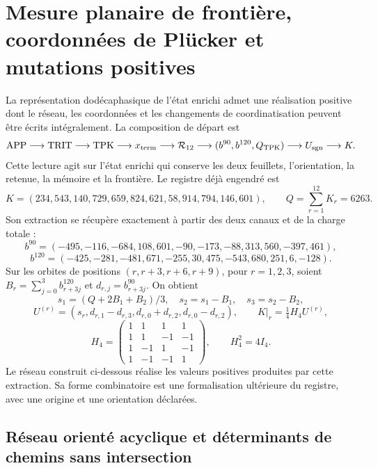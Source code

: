 \section{Mesure planaire de frontière, coordonnées de Plücker et mutations positives}
\label{app:network-cluster}

La représentation dodécaphasique de l'état enrichi admet une réalisation positive dont le réseau, les coordonnées et les changements de coordinatisation peuvent être écrits intégralement. La composition de départ est
\[
 \mathrm{APP}\longrightarrow\mathrm{TRIT}\longrightarrow\mathrm{TPK}
 \longrightarrow x_{\rm term}\longrightarrow\mathcal R_{12}
 \longrightarrow(b^{90},b^{120},Q_{\rm TPK})
 \longrightarrow U_{\rm sgn}\longrightarrow K.
\]
Cette lecture agit sur l’état enrichi qui conserve les deux feuillets,
l’orientation, la retenue, la mémoire et la frontière. Le registre déjà engendré
est
\[
 K=(234,543,140,729,659,824,621,58,914,794,146,601),
 \qquad Q=\sum_{r=1}^{12}K_r=6263.
\]
Son extraction se récupère exactement à partir des deux canaux et de la charge totale :
\[
 b^{90}=(-495,-116,-684,108,601,-90,-173,-88,313,560,-397,461),
\]
\[
 b^{120}=(-425,-281,-481,671,-255,30,475,-543,680,251,6,-128).
\]
Sur les orbites de positions \((r,r+3,r+6,r+9)\), pour \(r=1,2,3\),
soient \(B_r=\sum_{j=0}^3b^{120}_{r+3j}\) et
\(d_{r,j}=b^{90}_{r+3j}\). On obtient
\[
 s_1=(Q+2B_1+B_2)/3,\quad s_2=s_1-B_1,\quad s_3=s_2-B_2,
\]
\[
 U^{(r)}=(s_r,d_{r,1}-d_{r,3},d_{r,0}+d_{r,2},d_{r,0}-d_{r,2}),
 \qquad K|_r=\tfrac14H_4U^{(r)},
\]
\[
 H_4=\begin{pmatrix}1&1&1&1\\1&1&-1&-1\\1&-1&1&-1\\1&-1&-1&1\end{pmatrix},
 \qquad H_4^2=4I_4.
\]
Le réseau construit ci-dessous réalise les valeurs positives produites par cette extraction. Sa forme combinatoire est une formalisation ultérieure du registre, avec une origine et une orientation déclarées.

\subsection{Réseau orienté acyclique et déterminants de chemins sans intersection}

